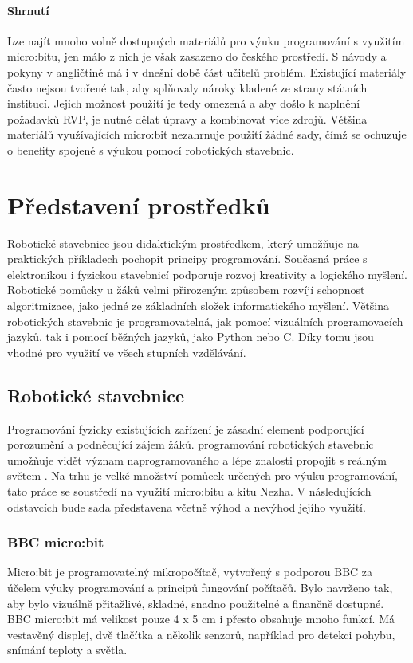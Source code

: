 \documentclass[
  digital,     %
  oneside,     %
  nosansbold,  %
  colorbold, %
  lof,         %
  nolot,         %
]{fithesis4}
\begin{document}
\subsubsection{Shrnutí}
Lze najít mnoho volně dostupných materiálů pro výuku programování s využitím micro:bitu, jen málo z nich je však zasazeno do českého prostředí. S návody a pokyny v angličtině má i v dnešní době část učitelů problém. Existující materiály často nejsou tvořené tak, aby splňovaly nároky kladené ze strany státních institucí. Jejich možnost použití je tedy omezená a aby došlo k naplnění požadavků RVP, je nutné dělat úpravy a kombinovat více zdrojů. Většina materiálů využívajících micro:bit nezahrnuje použití žádné sady, čímž se ochuzuje o benefity spojené s výukou pomocí robotických stavebnic.

\chapter{Představení prostředků}
Robotické stavebnice jsou didaktickým prostředkem, který umožňuje na praktických příkladech pochopit principy programování. Současná práce s elektronikou i fyzickou stavebnicí podporuje rozvoj kreativity a logického myšlení. Robotické pomůcky u žáků velmi přirozeným způsobem rozvíjí schopnost algoritmizace, jako jedné ze základních složek informatického myšlení. Většina robotických stavebnic je programovatelná, jak pomocí vizuálních programovacích jazyků, tak i pomocí běžných jazyků, jako Python nebo C. Díky tomu jsou vhodné pro využití ve všech stupních vzdělávání. 

\section{Robotické stavebnice}
Programování fyzicky existujících zařízení je zásadní element podporující porozumění a podněcující zájem žáků. programování robotických stavebnic umožňuje vidět význam naprogramovaného a lépe znalosti propojit s reálným světem \cite{Sentance17}. Na trhu je velké množství pomůcek určených pro výuku programování, tato práce se soustředí na využití micro:bitu a kitu Nezha.
V následujících odstavcích bude sada představena včetně výhod a nevýhod jejího využití. %

\subsection{BBC micro:bit}
Micro:bit je programovatelný mikropočítač, vytvořený s podporou BBC za účelem výuky programování a principů fungování počítačů. Bylo navrženo tak, aby bylo vizuálně přitažlivé, skladné, snadno použitelné a finančně dostupné. BBC micro:bit má velikost pouze 4 x 5 cm i přesto obsahuje mnoho funkcí.  Má vestavěný displej, dvě tlačítka a několik senzorů, například pro detekci pohybu, snímání teploty a světla. 
\end{document}
